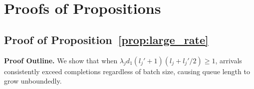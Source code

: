 %
%
%


\section{Proofs of Propositions}

\subsection{Proof of Proposition~\ref{prop:large_rate}}
\label{appendix:proof_large_rate}

\noindent\textbf{Proof Outline.} We show that when $\lambda_j d_1 (l_j'+1)(l_j + l_j'/2) \geq 1$, arrivals consistently exceed completions regardless of batch size, causing queue length to grow unboundedly.

